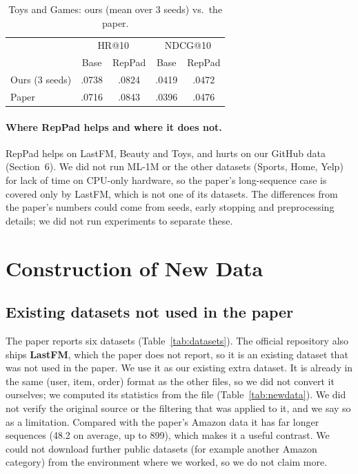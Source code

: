 \documentclass[11pt]{article}
\begin{document}
\begin{table}[t]
\centering\small
\begin{tabular}{lcccc}
\hline
 & \multicolumn{2}{c}{HR@10} & \multicolumn{2}{c}{NDCG@10} \\
 & Base & RepPad & Base & RepPad \\
\hline
Ours (3 seeds) & .0738 & .0824 & .0419 & .0472 \\
Paper & .0716 & .0843 & .0396 & .0476 \\
\hline
\end{tabular}
\caption{Toys and Games: ours (mean over 3 seeds) vs.\ the paper.}
\label{tab:toys}
\end{table}

\paragraph{Where RepPad helps and where it does not.}
RepPad helps on LastFM, Beauty and Toys, and hurts on our GitHub data
(Section~6). We did not run ML-1M or the other datasets (Sports, Home, Yelp) for lack of time on CPU-only hardware, so the paper's long-sequence case is covered only by LastFM, which is not one of its datasets. The differences from the paper's numbers could come from seeds, early stopping and preprocessing details; we did not run experiments to separate these.

\section{Construction of New Data}

\subsection{Existing datasets not used in the paper}

The paper reports six datasets (Table~\ref{tab:datasets}). The official repository also ships
\textbf{LastFM}, which the paper does not report, so it is an existing dataset that was not
used in the paper. We use it as our existing extra dataset. It is already in the same
(user, item, order) format as the other files, so we did not convert it ourselves; we
computed its statistics from the file (Table~\ref{tab:newdata}). We did not verify the original source or the
filtering that was applied to it, and we say so as a limitation. Compared with the paper's Amazon data it has
far longer sequences (48.2 on average, up to 899), which makes it a useful contrast.
We could not download further public datasets (for example another Amazon category) from
the environment where we worked, so we do not claim more.
\end{document}
